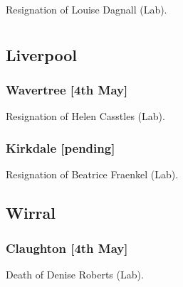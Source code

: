 \documentclass[a4paper,openany]{book}
\begin{document}
\begin{resultsiii}

Resignation of Louise Dagnall (Lab).

\section[Merseyside]{}

\subsection*{Liverpool}

\subsubsection*{Wavertree \hspace*{\fill}\nolinebreak[1]%
\enspace\hspace*{\fill}
[4th May]}


Resignation of Helen Casstles (Lab).

\subsubsection*{Kirkdale \hspace*{\fill}\nolinebreak[1]%
\enspace\hspace*{\fill}
[pending]}


Resignation of Beatrice Fraenkel (Lab).

\subsection*{Wirral}

\subsubsection*{Claughton \hspace*{\fill}\nolinebreak[1]%
\enspace\hspace*{\fill}
[4th May]}


Death of Denise Roberts (Lab).

\section[South Yorkshire]{}


\end{resultsiii}
\end{document}
